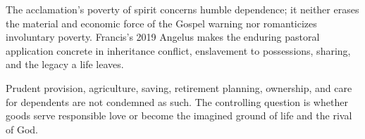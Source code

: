 The acclamation's poverty of spirit concerns humble dependence; it neither erases the material and economic force of the Gospel warning nor
romanticizes involuntary poverty. Francis's 2019 Angelus makes the enduring pastoral
application concrete in inheritance conflict, enslavement to possessions,
sharing, and the legacy a life leaves.

Prudent provision, agriculture, saving, retirement planning, ownership, and
care for dependents are not condemned as such. The controlling question is
whether goods serve responsible love or become the imagined ground of life
and the rival of God.
\label{triptych:brief-synthesis:end}
